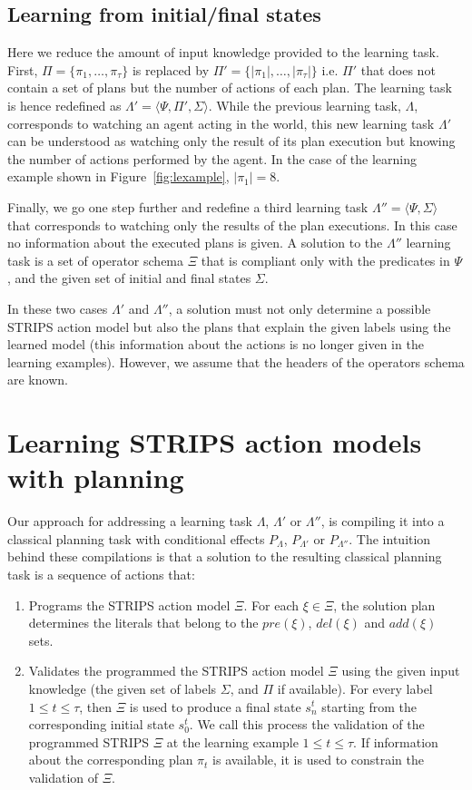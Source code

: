\documentclass[letterpaper]{article} %
\newcommand{\tup}[1]{{\langle #1 \rangle}}
\begin{document}
\subsection{Learning from initial/final states}
Here we reduce the amount of input knowledge provided to the learning task. First, $\Pi=\{\pi_1,\ldots,\pi_{\tau}\}$ is replaced by $\Pi'=\{|\pi_1|,\ldots,|\pi_{\tau}|\}$ i.e. $\Pi'$ that does not contain a set of plans but the number of actions of each plan. The learning task is hence redefined as $\Lambda'=\tup{\Psi,\Pi',\Sigma}$. While the previous learning task, $\Lambda$, corresponds to watching an agent acting in the world, this new learning task $\Lambda'$ can be understood as watching only the result of its plan execution but knowing the number of actions performed by the agent. In the case of the learning example shown in Figure~\ref{fig:lexample}, $|\pi_1|=8$. 

Finally, we go one step further and redefine a third learning task $\Lambda''=\tup{\Psi,\Sigma}$ that corresponds to watching only the results of the plan executions. In this case no information about the executed plans is given. A solution to the $\Lambda''$ learning task is a set of operator schema $\Xi$ that is compliant only with the predicates in $\Psi$, and the given set of initial and final states $\Sigma$.

In these two cases $\Lambda'$ and $\Lambda''$, a solution must not only determine a possible STRIPS action model but also the plans that explain the given labels using the learned model (this information about the actions is no longer given in the learning examples). However, we assume that the headers of the operators schema are known. 


\section{Learning STRIPS action models with planning}
Our approach for addressing a learning task $\Lambda$, $\Lambda'$ or $\Lambda''$, is compiling it into a classical planning task with conditional effects $P_{\Lambda}$, $P_{\Lambda'}$ or $P_{\Lambda''}$. The intuition behind these compilations is that a solution to the resulting classical planning task is a sequence of actions that:
\begin{enumerate}
\item Programs the STRIPS action model $\Xi$. For each $\xi\in\Xi$, the solution plan determines the literals that belong to the $pre(\xi)$, $del(\xi)$ and $add(\xi)$ sets.
\item Validates the programmed the STRIPS action model $\Xi$ using the given input knowledge (the given set of labels $\Sigma$, and $\Pi$ if available).  For every label {\small $1\leq t\leq \tau$}, then $\Xi$ is used to produce a final state $s_{n}^t$ starting from the corresponding initial state $s_0^t$. We call this process the validation of the programmed STRIPS $\Xi$ at the learning example {\small $1\leq t\leq \tau$}. If information about the corresponding plan $\pi_t$ is available, it is used to constrain the validation of $\Xi$.
\end{enumerate}
\end{document}
